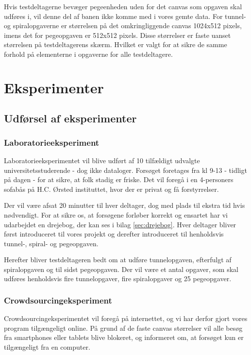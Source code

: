 Hvis testdeltagerne bevæger pegeenheden uden for det canvas som opgaven skal udføres i, vil denne del af banen ikke komme med i vores gemte data. For tunnel- og spiralopgaverne er størrelsen på det omkringliggende canvas 1024x512 pixels, imens det for pegeopgaven er 512x512 pixels. Disse størrelser er faste uanset størrelsen på testdeltagerens skærm. Hvilket er valgt for at sikre de samme forhold på elementerne i opgaverne for alle testdeltagere.

\chapter*{Eksperimenter}

\section*{Udførsel af eksperimenter}

\subsection*{Laboratorieeksperiment}
Laboratorieeksperimentet vil blive udført af 10 tilfældigt udvalgte universitetsstuderende - dog ikke dataloger.
Forsøget foretages fra kl 9-13 - tidligt på dagen - for at sikre, at folk stadig er friske. Det vil foregå i en 4-personers sofabås på H.C. Ørsted instituttet, hvor der er privat og få forstyrrelser.

Der vil være afsat 20 minutter til hver deltager, dog med plads til ekstra tid hvis nødvendigt. For at sikre os, at forsøgene forløber korrekt og ensartet har vi udarbejdet en drejebog, der kan ses i bilag \ref{sec:drejebog}. Hver deltager bliver først introduceret til vores projekt og derefter introduceret til henholdsvis tunnel-, spiral- og pegeopgaven.

Herefter bliver testdeltageren bedt om at udføre tunnelopgaven, efterfulgt af spiralopgaven og til sidst pegeopgaven. Der vil være et antal opgaver, som skal udføres henholdsvis fire tunnelopgaver, fire spiralopgaver og 25 pegeopgaver.

\subsection*{Crowdsourcingeksperiment}
Crowdsourcingeksperimentet vil foregå på internettet, og vi har derfor gjort vores program tilgængeligt online. På grund af de faste canvas størrelser vil alle besøg fra smartphones eller tablets blive blokeret, og informeret om, at forsøget kun er tilgængeligt fra en computer. 


